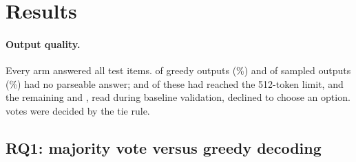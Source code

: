 \section{Results}\label{sec:results}

\paragraph{Output quality.} Every arm answered all \nTest{} test items. \unpGreedyN{} of \runsGreedyN{} greedy
outputs (\unpGreedyPct\%) and \unpSampledN{} of \runsSampledN{} sampled outputs (\unpSampledPct\%) had no
parseable answer; \unpGreedyTruncN{} and \unpSampledTruncN{} of these had reached the 512-token limit, and the
remaining \unpGreedyNotTruncN{} and \unpSampledNotTruncN{}, read during baseline validation, declined to choose an
option. \ties{} votes were decided by the tie rule.

\subsection{RQ1: majority vote versus greedy decoding}
\begin{table}[t]
\caption{RQ1: accuracy (\%) of the majority of 10 sampled runs ($T$ = 0.7) and of greedy decoding on the same
items. $\Delta$ = majority minus greedy in percentage points, 95\% paired bootstrap CI; $b$/$c$ = items right only
with the vote / only with greedy; $p$ = exact McNemar test. Only the first row is confirmatory.}
\label{tab:rq1}
\footnotesize

\end{table}

\begin{table}[t]
\caption{Post hoc analyses of the RQ1 difference: its split into a sampling part and a voting part, the vote against
each single run and against the second greedy run, and the difference by the MedQA split each item came from.}
\label{tab:posthoc}
\footnotesize

\end{table}

